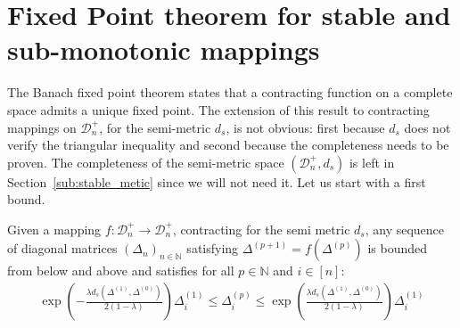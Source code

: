 \documentclass[a4papaer, titlepage]{book}
\begin{document}
\section{Fixed Point theorem for stable and sub-monotonic mappings}

The Banach fixed point theorem states that a contracting function on a complete space admits a unique fixed point. The extension of this result to contracting mappings on $\mathcal D_n^+$, for the semi-metric $d_s$, is not obvious: first because $d_s$ does not verify the triangular inequality and second because the completeness needs to be proven. The completeness of the semi-metric space $(\mathcal D_n^+,d_s)$ is left in Section~\ref{sub:stable_metic} since we will not need it.
Let us start with a first bound.
\begin{lemma}\label{lem:suite_iterative_application_contractante_borne}
  Given a mapping $f : \mathcal D_n^+ \to \mathcal D_n^+$, contracting for the semi metric $d_s$, any sequence of diagonal matrices $(\Delta_n)_{n \in \mathbb N}$ satisfying $\Delta^{(p+1)} = f(\Delta^{(p)})$ is bounded from below and above and satisfies for all $p\in \mathbb N$ and $i \in [n]$:
  \begin{align*}%
     \exp \left(- \frac{\lambda d_s \left( \Delta^{(1)}, \Delta^{(0)} \right)}{2(1- \lambda)} \right) \Delta^{(1)}_i
     \leq \Delta^{(p)}_i 
     \leq  \exp \left( \frac{\lambda d_s \left( \Delta^{(1)}, \Delta^{(0)} \right)}{2(1- \lambda)} \right) \Delta^{(1)}_i
  \end{align*}
\end{lemma}
\end{document}
